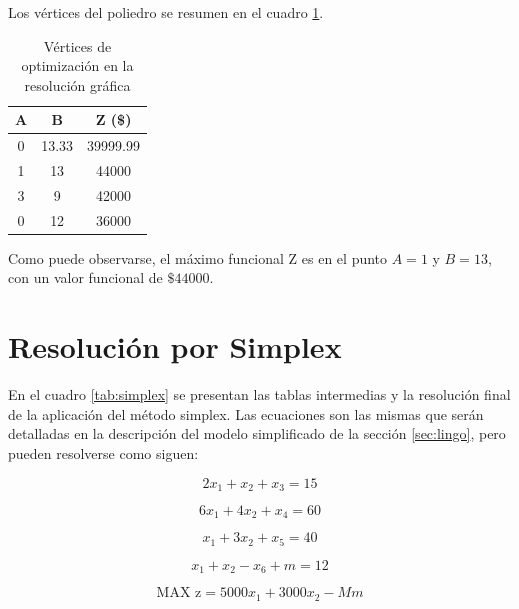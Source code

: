 \documentclass[a4paper,11pt]{article}
\begin{document}
\FloatBarrier

Los vértices del poliedro se resumen en el cuadro \ref{tab:resolucion}.

\begin{table}[h!]
\centering
\begin{tabular}{ | c | c | c | }
  \hline
  A & B     & Z (\$) \\ \hline
  0 & 13.33 & 39999.99\\ \hline
  1 & 13    & 44000 \\ \hline
  3 & 9     & 42000 \\ \hline
  0 & 12    & 36000 \\ \hline
\end{tabular}
\caption{Vértices de optimización en la resolución gráfica}\label{tab:resolucion}
\end{table}

\FloatBarrier

Como puede observarse, el máximo funcional Z es en el punto \(A = 1\) y \(B =
13\), con un valor funcional de \(\$44000\).

\section{Resolución por Simplex} \label{sec:simplex}

En el cuadro \ref{tab:simplex} se presentan las tablas intermedias y la
resolución final de la aplicación del método simplex. Las ecuaciones son las
mismas que serán detalladas en la descripción del modelo simplificado de la
sección \ref{sec:lingo}, pero pueden resolverse como siguen:

\[
  2x_1 + x_2 + x_3 = 15
\]

\[
  6x_1 + 4x_2 + x_4 = 60
\]

\[
  x_1 + 3x_2 + x_5 = 40
\]

\[
  x_1 + x_2 - x_6 + m = 12
\]

\[
  \text{MAX z} = 5000x_1 + 3000x_2 - Mm
\]
\end{document}

